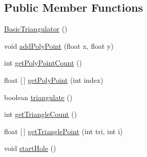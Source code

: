 \subsection*{Public Member Functions}
\begin{DoxyCompactItemize}
\item 
\mbox{\hyperlink{classorg_1_1newdawn_1_1slick_1_1geom_1_1_basic_triangulator_ae7d8ea74bd4e178920cc7d51a7d884f8}{Basic\+Triangulator}} ()
\item 
void \mbox{\hyperlink{classorg_1_1newdawn_1_1slick_1_1geom_1_1_basic_triangulator_a72549d87e657743bc012c0a34784751c}{add\+Poly\+Point}} (float x, float y)
\item 
int \mbox{\hyperlink{classorg_1_1newdawn_1_1slick_1_1geom_1_1_basic_triangulator_adb3cafb83d9c2c6ee8353ec59e4f3365}{get\+Poly\+Point\+Count}} ()
\item 
float \mbox{[}$\,$\mbox{]} \mbox{\hyperlink{classorg_1_1newdawn_1_1slick_1_1geom_1_1_basic_triangulator_a63c53a60771863deae6ed9b39a385e22}{get\+Poly\+Point}} (int index)
\item 
boolean \mbox{\hyperlink{classorg_1_1newdawn_1_1slick_1_1geom_1_1_basic_triangulator_ab83576d3940583b73bf3224acacf4e48}{triangulate}} ()
\item 
int \mbox{\hyperlink{classorg_1_1newdawn_1_1slick_1_1geom_1_1_basic_triangulator_a1deef9bca53fc40ff881923133bb22b1}{get\+Triangle\+Count}} ()
\item 
float \mbox{[}$\,$\mbox{]} \mbox{\hyperlink{classorg_1_1newdawn_1_1slick_1_1geom_1_1_basic_triangulator_a107a1682eeeb57956a9b14f0d733a038}{get\+Triangle\+Point}} (int tri, int i)
\item 
void \mbox{\hyperlink{classorg_1_1newdawn_1_1slick_1_1geom_1_1_basic_triangulator_a8395cee6a1e791551bf8076cdcf91e84}{start\+Hole}} ()
\end{DoxyCompactItemize}
